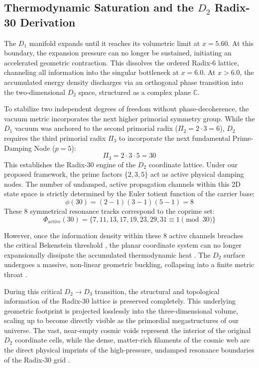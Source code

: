 \documentclass[twocolumn]{aa}
\begin{document}
\subsection{Thermodynamic Saturation and the $D_{2}$ Radix-30 Derivation}
The $D_1$ manifold expands until it reaches its volumetric limit at $x = 5.60$. At this boundary, the expansion pressure can no longer be sustained, initiating an accelerated geometric contraction. This dissolves the ordered Radix-6 lattice, channeling all information into the singular bottleneck at $x = 6.0$. At $x > 6.0$, the accumulated energy density discharges via an orthogonal phase transition into the two-dimensional $D_2$ space, structured as a complex plane $\mathbb{C}$.

To stabilize two independent degrees of freedom without phase-decoherence, the vacuum metric incorporates the next higher primorial symmetry group. While the $D_1$ vacuum was anchored to the second primorial radix ($\Pi_2 = 2 \cdot 3 = 6$), $D_2$ requires the third primorial radix $\Pi_3$ to incorporate the next fundamental Prime-Damping Node ($p=5$):
\begin{equation}
\Pi_3 = 2 \cdot 3 \cdot 5 = 30
\end{equation}
This establishes the Radix-30 engine of the $D_2$ coordinate lattice. Under our proposed framework, the prime factors $\{2, 3, 5\}$ act as active physical damping nodes. The number of undamped, active propagation channels within this 2D state space is strictly determined by the Euler totient function of the carrier base:
\begin{equation}
\phi(30) = (2 - 1)(3 - 1)(5 - 1) = 8
\end{equation}
These 8 symmetrical resonance tracks correspond to the coprime set:
\begin{equation}
\Phi_{\text{active}}(30) = \{7, 11, 13, 17, 19, 23, 29, 31 \equiv 1 \pmod{30}\}
\end{equation}

However, once the information density within these 8 active channels breaches the critical Bekenstein threshold \cite{bekenstein1981}, the planar coordinate system can no longer expansionally dissipate the accumulated thermodynamic heat \cite{bekenstein1981, landauer1961}. The $D_2$ surface undergoes a massive, non-linear geometric buckling, collapsing into a finite metric throat \cite{hawking1975}. 

During this critical $D_2 \rightarrow D_3$ transition, the structural and topological information of the Radix-30 lattice is preserved completely. This underlying geometric footprint is projected losslessly into the three-dimensional volume, scaling up to become directly visible as the primordial megastructures of our universe. The vast, near-empty cosmic voids represent the interior of the original $D_2$ coordinate cells, while the dense, matter-rich filaments of the cosmic web are the direct physical imprints of the high-pressure, undamped resonance boundaries of the Radix-30 grid \cite{volovik2003}.
\end{document}
